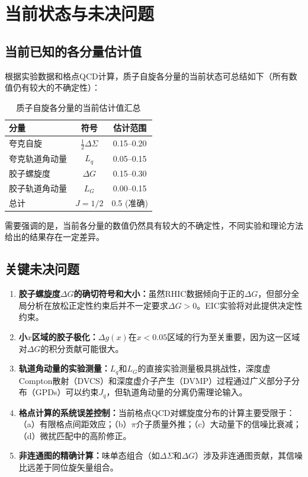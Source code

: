 \documentclass[12pt,a4paper]{ctexart}
\theoremstyle{definition}
\begin{document}
\section{当前状态与未决问题}

\subsection{当前已知的各分量估计值}

根据实验数据和格点QCD计算，质子自旋各分量的当前状态可总结如下（所有数值仍有较大的不确定性）：

\begin{table}[H]
\centering
\caption{质子自旋各分量的当前估计值汇总}
\label{tab:spin_budget}
\begin{tabular}{lcc}
\toprule
分量 & 符号 & 估计范围 \\
\midrule
夸克自旋 & $\frac{1}{2}\Delta\Sigma$ & 0.15--0.20 \\
夸克轨道角动量 & $L_q$ & 0.05--0.15 \\
胶子螺旋度 & $\Delta G$ & 0.15--0.30 \\
胶子轨道角动量 & $L_G$ & 0.00--0.15 \\
\midrule
总计 & $J = 1/2$ & 0.5 (准确) \\
\bottomrule
\end{tabular}
\end{table}

需要强调的是，当前各分量的数值仍然具有较大的不确定性，不同实验和理论方法给出的结果存在一定差异。

\subsection{关键未决问题}

\begin{enumerate}
    \item \textbf{胶子螺旋度$\Delta G$的确切符号和大小：}虽然RHIC数据倾向于正的$\Delta G$\cite{DSSV14}，但部分全局分析在放松正定性约束后并不一定要求$\Delta G > 0$\cite{JAM24}。EIC实验将对此提供决定性约束。

    \item \textbf{小$x$区域的胶子极化：}$\Delta g(x)$在$x < 0.05$区域的行为至关重要，因为这一区域对$\Delta G$的积分贡献可能很大\cite{Egerer2022}。

    \item \textbf{轨道角动量的实验测量：}$L_q$和$L_G$的直接实验测量极具挑战性，深度虚Compton散射（DVCS）和深度虚介子产生（DVMP）过程通过广义部分子分布（GPDs）可以约束$J_q$，但轨道角动量的分离仍需理论输入\cite{Ji1997}。

    \item \textbf{格点计算的系统误差控制：}当前格点QCD对螺旋度分布的计算主要受限于：（a）有限格点间距效应；（b）$\pi$介子质量外推；（c）大动量下的信噪比衰减；（d）微扰匹配中的高阶修正\cite{Chen2025gluon,LP3helicity}。

    \item \textbf{非连通图的精确计算：}味单态组合（如$\Delta\Sigma$和$\Delta G$）涉及非连通图贡献，其信噪比远差于同位旋矢量组合\cite{NoteGluonPDFs}。
\end{enumerate}
\end{document}
